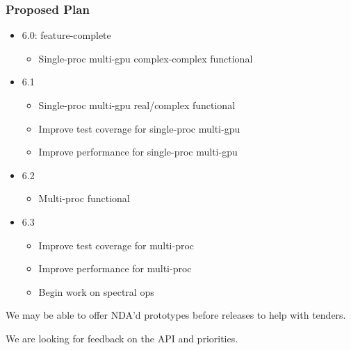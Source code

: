 \documentclass[10pt,aspectratio=169]{beamer}
\begin{document}
\begin{frame}
  \frametitle{Proposed Plan}

  \begin{itemize}
  \item 6.0: feature-complete
    \begin{itemize}
    \item Single-proc multi-gpu complex-complex functional
    \end{itemize}
  \item 6.1
    \begin{itemize}
    \item Single-proc multi-gpu real/complex functional
    \item Improve test coverage for single-proc multi-gpu
    \item Improve performance for single-proc multi-gpu
    \end{itemize}
  \item 6.2
    \begin{itemize}
    \item Multi-proc functional
    \end{itemize}
  \item 6.3
    \begin{itemize}
    \item Improve test coverage for multi-proc
    \item Improve performance for multi-proc
    \item Begin work on spectral ops
    \end{itemize}
  \end{itemize}

  \medskip

  We may be able to offer NDA'd prototypes before releases to help
  with tenders.

  \medskip

  We are looking for feedback on the API and priorities.
  
\end{frame}
\end{document}

